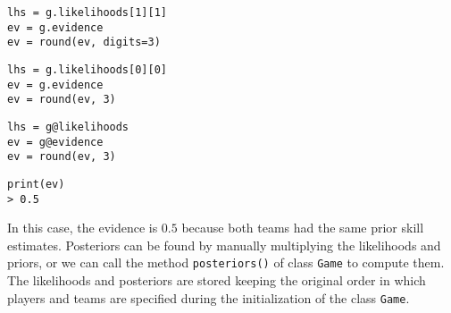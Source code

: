 \documentclass[article]{jss}
\begin{document}
%
\begin{paracol}{3}
\begin{lstlisting}[backgroundcolor=\color{julia!60},belowskip=0cm]
lhs = g.likelihoods[1][1]
ev = g.evidence
ev = round(ev, digits=3)
\end{lstlisting}
  \switchcolumn
\begin{lstlisting}[backgroundcolor=\color{python!60},belowskip=0cm]
lhs = g.likelihoods[0][0]
ev = g.evidence
ev = round(ev, 3)
\end{lstlisting}
   \switchcolumn
\begin{lstlisting}[backgroundcolor=\color{r!50},belowskip=0cm]
lhs = g@likelihoods
ev = g@evidence
ev = round(ev, 3)
\end{lstlisting}
\end{paracol}
\begin{lstlisting}[captionpos=b,backgroundcolor=\color{all},label=lst:evidence_likelihoods,caption={Evidence and likelihoods queries.},aboveskip=0cm,belowskip=0cm]
print(ev)
> 0.5
\end{lstlisting}
%
In this case, the evidence is $0.5$ because both teams had the same prior skill estimates. 
Posteriors can be found by manually multiplying the likelihoods and priors, or we can call the method \texttt{posteriors()} of class \texttt{Game} to compute them. 
The likelihoods and posteriors are stored keeping the original order in which players and teams are specified during the initialization of the class \texttt{Game}. 
\end{document}
